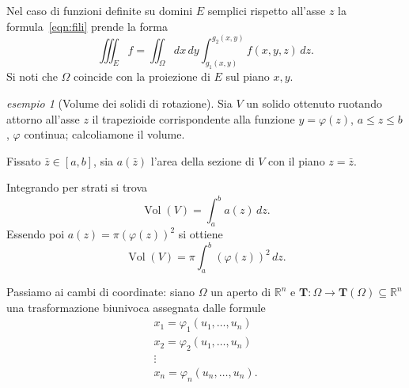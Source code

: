 \documentclass[a4paper]{book}
\DeclareMathOperator{\Vol}{Vol}
\numberwithin{equation}{section}
\renewcommand{\phi}{\varphi}
\theoremstyle{plain}
\theoremstyle{definition}
\theoremstyle{remark}
\renewcommand{\vec}{\boldsymbol}
\theoremstyle{example}
\newtheorem{exmp}{esempio}[section]
\begin{document}
Nel caso di funzioni definite su domini $E$ semplici rispetto all'asse $z$ la formula~\eqref{eqn:fili} prende la forma
\begin{equation}
	\iiint_E f = \iint_{\Omega} dx \, dy \int_{g_1(x, y)}^{g_2(x, y)}f(x, y, z)\, dz.
\end{equation}
Si noti che $\Omega$ coincide con la proiezione di $E$ sul piano $x, y$.

\begin{exmp}[Volume dei solidi di rotazione]
	Sia $V$ un solido ottenuto ruotando attorno all'asse $z$ il trapezioide corrispondente alla funzione $y = \phi(z)$, $a \le z \le b$, $\phi$ continua; calcoliamone il volume.

	Fissato $\bar{z} \in [a, b]$, sia $a(\bar{z})$ l'area della sezione di $V$ con il piano $z = \bar{z}$.

	Integrando per strati si trova
	\begin{equation*}
		\Vol(V) = \int_a^b a(z)\,dz.
	\end{equation*}
	Essendo poi $a(z) = \pi(\phi(z))^2$ si ottiene
	\begin{equation*}
		\Vol(V) = \pi \int_a^b (\phi(z))^2\,dz.
	\end{equation*}
\end{exmp}

Passiamo ai cambi di coordinate: siano $\Omega$ un aperto di $\mathbb{R}^n$ e $\vec{T}\colon\Omega \to \vec{T}(\Omega) \subseteq \mathbb{R}^n$ una trasformazione biunivoca assegnata dalle formule
\begin{gather*}
	x_1 = \phi_1(u_1, \dots, u_n) \\
	x_2 = \phi_2(u_1, \dots, u_n) \\
	\vdots \\
	x_ n = \phi_n(u_n, \dots, u_n).
\end{gather*}
\end{document}
